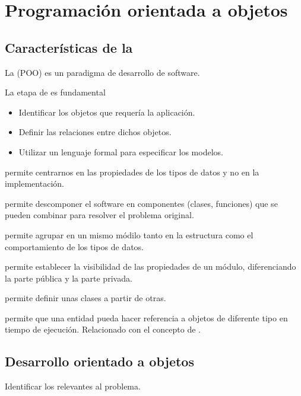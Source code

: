 \section{Programación orientada a objetos}
\subsection{Características de la \Poo}
La \lb{\Poo} (POO) es un paradigma de desarrollo de software. 
\begin{center}
\end{center}
La etapa de  es fundamental
\begin{itemize}
	\item Identificar los objetos que requería la aplicación.
	\item Definir las relaciones entre dichos objetos.
	\item Utilizar un lenguaje formal para especificar los modelos.
\end{itemize}
 permite centrarnos en las propiedades de los tipos de datos y no en la implementación.

 permite descomponer el software en componentes (clases, funciones) que se pueden combinar para resolver el problema original.

 permite agrupar en un mismo módilo tanto en la estructura como el comportamiento de los tipos de datos.

 permite establecer la visibilidad de las propiedades de un módulo, diferenciando la parte pública y la parte privada.

 permite definir unas clases a partir de otras.

 permite que una entidad pueda hacer referencia a objetos de diferente tipo en tiempo de ejecución. Relacionado con el concepto de .
\subsection{Desarrollo orientado a objetos}
Identificar los  relevantes al problema.


